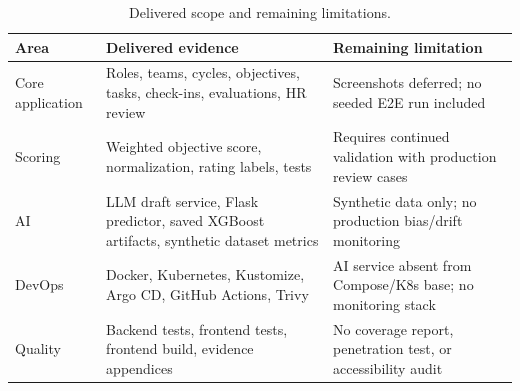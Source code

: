 \begin{table}[H]\centering\small
\caption{Delivered scope and remaining limitations.}
\label{tab:delivered-limitations}
\begin{tabularx}{\textwidth}{p{}p{}Y}
\toprule
Area & Delivered evidence & Remaining limitation\\
\midrule
Core application & Roles, teams, cycles, objectives, tasks, check-ins, evaluations, HR review & Screenshots deferred; no seeded E2E run included\\
Scoring & Weighted objective score, normalization, rating labels, tests & Requires continued validation with production review cases\\
AI & LLM draft service, Flask predictor, saved XGBoost artifacts, synthetic dataset metrics & Synthetic data only; no production bias/drift monitoring\\
DevOps & Docker, Kubernetes, Kustomize, Argo CD, GitHub Actions, Trivy & AI service absent from Compose/K8s base; no monitoring stack\\
Quality & Backend tests, frontend tests, frontend build, evidence appendices & No coverage report, penetration test, or accessibility audit\\
\bottomrule
\end{tabularx}
\end{table}
